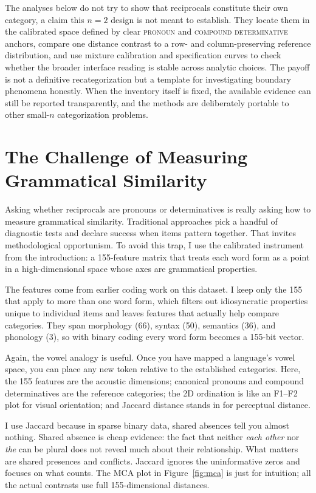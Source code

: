 \documentclass[12pt]{article}
\providecommand{\term}[1]{\textsc{#1}}
\providecommand{\mention}[1]{\textit{#1}}
\begin{document}
The analyses below do not try to show that reciprocals constitute their own category, a claim this $n=2$ design is not meant to establish. They locate them in the calibrated space defined by clear \term{pronoun} and \term{compound determinative} anchors, compare one distance contrast to a row- and column-preserving reference distribution, and use mixture calibration and specification curves to check whether the broader interface reading is stable across analytic choices. The payoff is not a definitive recategorization but a template for investigating boundary phenomena honestly. When the inventory itself is fixed, the available evidence can still be reported transparently, and the methods are deliberately portable to other small-$n$ categorization problems.


\section{The Challenge of Measuring Grammatical Similarity}

Asking whether reciprocals are pronouns or determinatives is really asking how to measure grammatical similarity. Traditional approaches pick a handful of diagnostic tests and declare success when items pattern together. That invites methodological opportunism. To avoid this trap, I use the calibrated instrument from the introduction: a 155-feature matrix that treats each word form as a point in a high-dimensional space whose axes are grammatical properties.

The features come from earlier coding work on this dataset. I keep only the 155 that apply to more than one word form, which filters out idiosyncratic properties unique to individual items and leaves features that actually help compare categories. They span morphology (66), syntax (50), semantics (36), and phonology (3), so with binary coding every word form becomes a 155-bit vector.

Again, the vowel analogy is useful. Once you have mapped a language's vowel space, you can place any new token relative to the established categories. Here, the 155 features are the acoustic dimensions; canonical pronouns and compound determinatives are the reference categories; the 2D ordination is like an F1--F2 plot for visual orientation; and Jaccard distance stands in for perceptual distance.

I use Jaccard because in sparse binary data, shared absences tell you almost nothing. Shared absence is cheap evidence: the fact that neither \mention{each other} nor \mention{the} can be plural does not reveal much about their relationship. What matters are shared presences and conflicts. Jaccard ignores the uninformative zeros and focuses on what counts. The MCA plot in Figure~\ref{fig:mca} is just for intuition; all the actual contrasts use full 155-dimensional distances.
\end{document}
